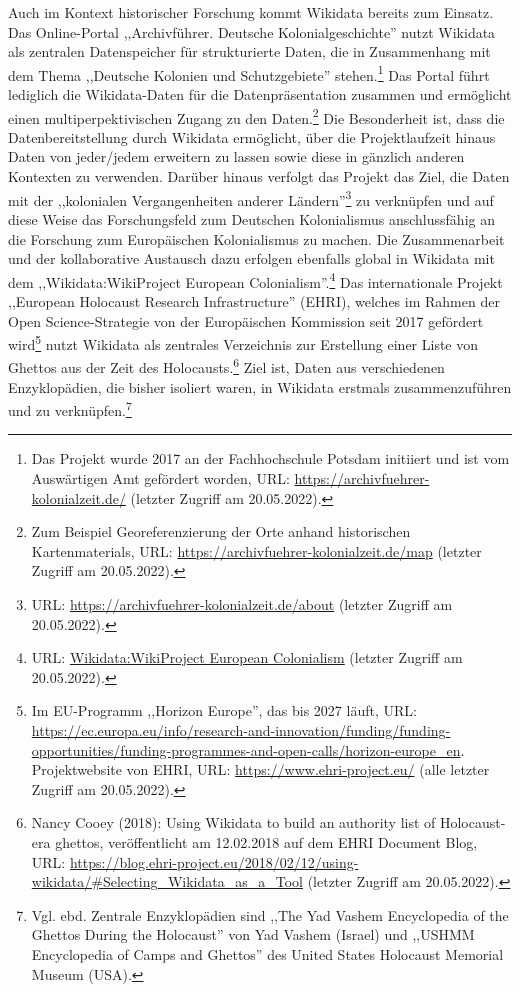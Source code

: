 Auch im Kontext historischer Forschung kommt Wikidata bereits zum Einsatz. Das Online-Portal ,,Archivführer. Deutsche Kolonialgeschichte'' nutzt Wikidata als zentralen Datenspeicher für strukturierte Daten, die in Zusammenhang mit dem Thema ,,Deutsche Kolonien und Schutzgebiete'' stehen.\footnote{Das Projekt wurde 2017 an der Fachhochschule Potsdam initiiert und ist vom Auswärtigen Amt gefördert worden, URL: \url{https://archivfuehrer-kolonialzeit.de/} (letzter Zugriff am 20.05.2022).} Das Portal führt lediglich die Wikidata-Daten für die Datenpräsentation zusammen und ermöglicht einen multiperpektivischen Zugang zu den Daten.\footnote{Zum Beispiel Georeferenzierung der Orte anhand historischen Kartenmaterials, URL: \url{https://archivfuehrer-kolonialzeit.de/map} (letzter Zugriff am 20.05.2022).} Die Besonderheit ist, dass die Datenbereitstellung durch Wikidata ermöglicht, über die Projektlaufzeit hinaus Daten von jeder/jedem erweitern zu lassen sowie diese in gänzlich anderen Kontexten zu verwenden. Darüber hinaus verfolgt das Projekt das Ziel, die Daten mit der ,,kolonialen Vergangenheiten anderer Ländern''\footnote{URL: \url{https://archivfuehrer-kolonialzeit.de/about} (letzter Zugriff am 20.05.2022).} zu verknüpfen und auf diese Weise das Forschungsfeld zum Deutschen Kolonialismus anschlussfähig an die Forschung zum Europäischen Kolonialismus zu machen. Die Zusammenarbeit und der kollaborative Austausch dazu erfolgen ebenfalls global in Wikidata mit dem ,,Wikidata:WikiProject European Colonialism''.\footnote{URL: \url{Wikidata:WikiProject European Colonialism} (letzter Zugriff am 20.05.2022).} Das internationale Projekt ,,European Holocaust Research Infrastructure'' (EHRI), welches im Rahmen der Open Science-Strategie von der Europäischen Kommission seit 2017 gefördert wird\footnote{Im EU-Programm ,,Horizon Europe'', das bis 2027 läuft, URL: \url{https://ec.europa.eu/info/research-and-innovation/funding/funding-opportunities/funding-programmes-and-open-calls/horizon-europe_en}. Projektwebsite von EHRI, URL: \url{https://www.ehri-project.eu/} (alle letzter Zugriff am 20.05.2022).} nutzt Wikidata als zentrales Verzeichnis zur Erstellung einer Liste von Ghettos aus der Zeit des Holocausts.\footnote{Nancy Cooey (2018): Using Wikidata to build an authority list of Holocaust-era ghettos, veröffentlicht am 12.02.2018 auf dem EHRI Document Blog, URL: \url{https://blog.ehri-project.eu/2018/02/12/using-wikidata/\#Selecting\_Wikidata\_as\_a\_Tool} (letzter Zugriff am 20.05.2022).} Ziel ist, Daten aus verschiedenen Enzyklopädien, die bisher isoliert waren, in Wikidata erstmals zusammenzuführen und zu verknüpfen.\footnote{Vgl. ebd. Zentrale Enzyklopädien sind ,,The Yad Vashem Encyclopedia of the Ghettos During the Holocaust'' von Yad Vashem (Israel) und ,,USHMM Encyclopedia of Camps and Ghettos'' des United States Holocaust Memorial Museum (USA).}

